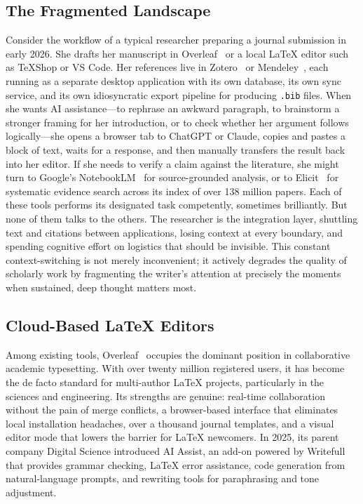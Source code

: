 \documentclass[a4paper,11pt]{article}
\begin{document}
\subsection{The Fragmented Landscape}

Consider the workflow of a typical researcher preparing a journal submission in early 2026. She drafts her manuscript in Overleaf~\cite{Overleaf} or a local LaTeX editor such as TeXShop or VS Code. Her references live in Zotero~\cite{Zotero} or Mendeley~\cite{Mendeley}, each running as a separate desktop application with its own database, its own sync service, and its own idiosyncratic export pipeline for producing \texttt{.bib} files. When she wants AI assistance---to rephrase an awkward paragraph, to brainstorm a stronger framing for her introduction, or to check whether her argument follows logically---she opens a browser tab to ChatGPT or Claude, copies and pastes a block of text, waits for a response, and then manually transfers the result back into her editor. If she needs to verify a claim against the literature, she might turn to Google's NotebookLM~\cite{NotebookLM} for source-grounded analysis, or to Elicit~\cite{Elicit} for systematic evidence search across its index of over 138 million papers. Each of these tools performs its designated task competently, sometimes brilliantly. But none of them talks to the others. The researcher is the integration layer, shuttling text and citations between applications, losing context at every boundary, and spending cognitive effort on logistics that should be invisible. This constant context-switching is not merely inconvenient; it actively degrades the quality of scholarly work by fragmenting the writer's attention at precisely the moments when sustained, deep thought matters most.

\subsection{Cloud-Based LaTeX Editors}

Among existing tools, Overleaf~\cite{Overleaf} occupies the dominant position in collaborative academic typesetting. With over twenty million registered users, it has become the de facto standard for multi-author LaTeX projects, particularly in the sciences and engineering. Its strengths are genuine: real-time collaboration without the pain of merge conflicts, a browser-based interface that eliminates local installation headaches, over a thousand journal templates, and a visual editor mode that lowers the barrier for LaTeX newcomers. In 2025, its parent company Digital Science introduced AI Assist, an add-on powered by Writefull that provides grammar checking, LaTeX error assistance, code generation from natural-language prompts, and rewriting tools for paraphrasing and tone adjustment.
\end{document}
